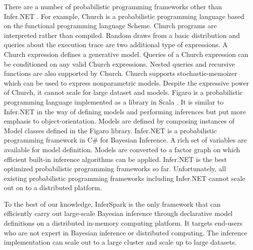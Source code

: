 There are a number of probabilistic programming frameworks other than
Infer.NET \cite{InferNET14}.  For example, Church \cite{GMR+08} is a
probabilistic programming language based on the functional programming
language Scheme.  Church programs are interpreted rather than compiled.
Random draws from a basic distribution and queries about the execution trace
are two additional type of expressions. A Church expression defines a
generative model. Queries of a Church expression can be conditioned on any
valid Church expressions. Nested queries and recursive functions are also
supported by Church. Church supports stochastic-memoizer which can be used to
express nonparametric models.  Despite the expressive power of Church, it
cannot scale for large dataset and models.  Figaro is a probabilistic
programming language implemented as a library in Scala \cite{Figaro}.  It is
similar to Infer.NET in the way of defining models and performing inferences
but put more emphasis to object-orientation. Models are defined by composing
instances of Model classes defined in the Figaro library.  Infer.NET is a
probabilistic programming framework in C\# for Bayesian Inference. A rich set
of variables are available for model definition. Models are converted to a
factor graph on which efficient built-in inference algorithms can be applied.
Infer.NET is the best optimized probabilistic programming frameworks so far.
Unfortunately, all existing probabilistic programming frameworks including
Infer.NET cannot scale out on to a distributed platform.

To the best of our knowledge, InferSpark is the only framework that can
efficiently carry out large-scale Bayesian inference through declarative
model definitions on a distributed in-memory computing platform. It targets
end-users who are not expert in Bayesian inference or distributed computing.
The inference implementation can scale out to a large cluster and scale up to
large datasets.

%










